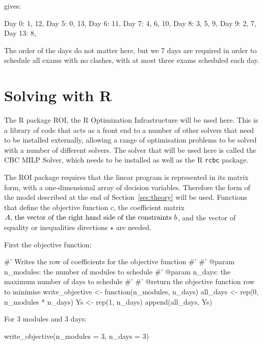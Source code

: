 gives:

\begin{pyout}

Day 0: 1, 12, 
Day 5: 0, 13, 
Day 6: 11, 
Day 7: 4, 6, 10, 
Day 8: 3, 5, 9, 
Day 9: 2, 7, 
Day 13: 8,
\end{pyout}

The order of the days do not matter here, but we 7 days are required in order to
schedule all exams with no clashes, with at most three exams scheduled each day.

\section{Solving with R}\label{sec:solving-with-R}

The R package ROI, the R Optimization
Infrastructure will be used here.
This is a library of code that acts as a front end to a number of other solvers
that need to be installed externally, allowing a range of optimisation problems
to be solved with a number of different solvers.
The solver that will be used here is called the CBC MILP Solver, which needs to
be installed as well as the R \texttt{rcbc} package.

The ROI package requires that the linear program is
represented in its matrix form, with a one-dimensional array of decision
variables. Therefore the form of the model described at the end of
Section~\ref{sec:theory} will be used.
Functions that define the objective function \(c\), the coefficient
matrix \(A$, the vector of the right hand side of the constraints $b\), and the
vector of equality or inequalities directions \(\star\) are needed.

First the objective function:

\begin{Rin-no-test}
#' Writes the row of coefficients for the objective function
#'
#' @param n_modules: the number of modules to schedule
#' @param n_days: the maximum number of days to schedule
#'
#' @return the objective function row to minimise
write_objective <- function(n_modules, n_days){
  all_days <- rep(0, n_modules * n_days)
  Ys <- rep(1, n_days)
  append(all_days, Ys)
}
\end{Rin-no-test}

For 3 modules and 3 days:

\begin{Rin-no-test}
write_objective(n_modules = 3, n_days = 3)
\end{Rin-no-test}

